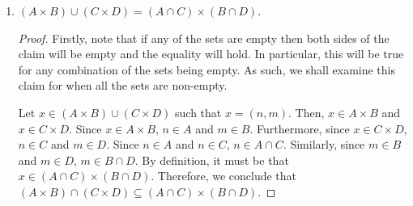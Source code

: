 \documentclass[12pt]{article}
\begin{document}
\begin{enumerate}[label=(\alph*)]
\begin{proof}
		From this, we've noted that this identity will fail if $A$ is empty, $B,C,$ and $D$
		are non-empty such that $B - D \neq \emptyset$. Thus, $C \times D \subset 
		C \times (B \cup D)$. Since $B - D$ is nonempty, there exists some $d \in D$
		such that $d \notin B$, Thus, this is a strict inclusion and therefore the equality
		does not hold. As such, it is not true in general that $(A \cup C) \times (B \cup D)
		\subseteq (A \times B) \cup (C \times D)$. We may check for the opposite direction
		of the inclusion.
		
		Assume that all sets are non-empty, as we have already checked the cases where 
		each set is empty and they all agree that $(A \times B) \cup (C \times D) \subseteq 
		(A \cup C) \times (B \cup D)$.
		
		Let $x \in (A \times B) \cup (C \times D)$. By definition, either $x \in A \times B$,
		$x \in C \times D$, or $x$ is an element of both sets. Let $x = (n, m)$. If 
		$x \in A \times B$, then $n \in A$ and $m \in B$. In particular, $n \in A \cup C$
		and $m \in B \cup D$. Therefore, $x \in (A \cup C) \times (B \cup D)$. We arrive 
		at the same conclusion if $x \in C \times D$ through an analogous argument.
		Therefore, we can conclude that $(A \times B) \cup (C \times D) \subseteq 
		(A \cup C) \times (B \cup D)$.
	\end{proof}
	\item $(A \times B) \cup (C \times D) = (A \cap C) \times (B \cap D)$.
	\begin{proof}
		Firstly, note that if any of the sets are empty then both sides of the claim 
		will be empty and the equality will hold. In particular, this will be true 
		for any combination of the sets being empty. As such, we shall examine this 
		claim for when all the sets are non-empty.
		
		Let $x \in (A \times B) \cup (C \times D)$ such that $x = (n, m)$. Then, 
		$x \in A \times B$ and $x \in C \times D$. Since $x \in A \times B$, $n \in A$
		and $m \in B$. Furthermore, since $x \in C \times D$, $n \in C$ and $m \in D$.
		Since $n \in A$ and $n \in C$, $n \in A \cap C$. Similarly, since $m \in B$
		and $m \in D$, $m \in B \cap D$. By definition, it must be that 
		$x \in (A \cap C) \times (B \cap D)$. Therefore, we conclude that 
		$(A \times B) \cap (C \times D) \subseteq (A \cap C) \times (B \cap D)$.
		

\end{proof}
\end{enumerate}
\end{document}
